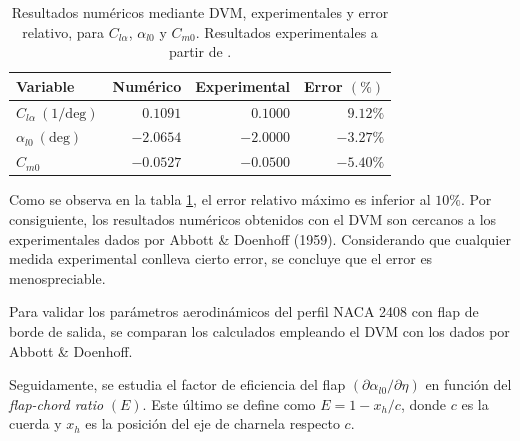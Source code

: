 \begin{table}[h]
    \centering
    \begin{tabular}{lrrr}
        \toprule[0.5mm]
        Variable & Numérico & Experimental & Error $\left( \% \right)$ \\
        \midrule[0.25mm]
        $C_{l\alpha} \ \left( 1 /\mathrm{deg} \right)$ & 
        $0.1091$ & $0.1000$ & $9.12 \%$ \\
        $\alpha_{l0} \ \left( \mathrm{deg} \right)$ & $-2.0654$ & 
        $-2.0000$ & $-3.27 \%$ \\
        $C_{m0}$ & $-0.0527$ & $-0.0500$ & $-5.40\%$ \\
        \bottomrule[0.5mm]
    \end{tabular}
    \caption{Resultados numéricos mediante DVM, experimentales y error relativo, para $C_{l\alpha}$, $\alpha_{l0}$ y $C_{m0}$. Resultados experimentales a partir de \cite{abbott}.}
    \label{tab:comparacion_numerico_experimental_error}
\end{table}

Como se observa en la tabla \ref{tab:comparacion_numerico_experimental_error}, el error relativo máximo es inferior al $10\%$. Por consiguiente, los resultados numéricos obtenidos con el DVM son cercanos a los experimentales dados por Abbott \& Doenhoff (1959). Considerando que cualquier medida experimental conlleva cierto error, se concluye que el error es menospreciable.

Para validar los parámetros aerodinámicos del perfil NACA 2408 con flap de borde de salida, se comparan los calculados empleando el DVM con los dados por Abbott \& Doenhoff.

Seguidamente, se estudia el factor de eficiencia del flap $\left( \partial \alpha_{l0} / \partial \eta \right)$ en función del \emph{flap-chord ratio} $\left( E \right)$. Este último se define como $E = 1 - x_h/c$, donde $c$ es la cuerda y $x_h$ es la posición del eje de charnela respecto $c$. 

